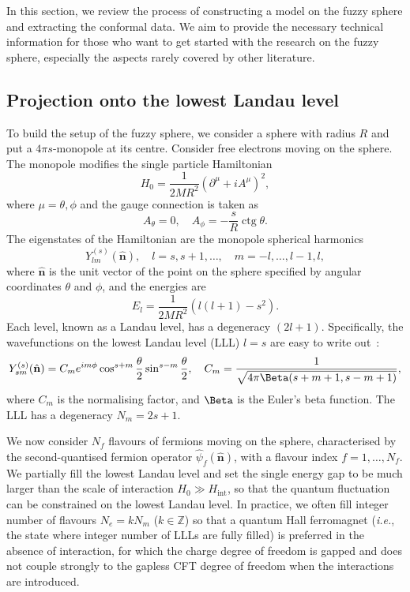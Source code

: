 \documentclass{timesjhep}
\begin{document}
In this section, we review the process of constructing a model on the fuzzy sphere and extracting the conformal data. We aim to provide the necessary technical information for those who want to get started with the research on the fuzzy sphere, especially the aspects rarely covered by other literature.

\subsection{Projection onto the lowest Landau level}
\label{sec:setup}

To build the setup of the fuzzy sphere, we consider a sphere with radius $R$ and put a $4\pi s$-monopole at its centre. Consider free electrons moving on the sphere. The monopole modifies the single particle Hamiltonian~\cite{Haldane1983LLL,Wu1976LLL,Greiter2011LLL,Hasebe2010LLL}
\begin{equation}
    H_0=\frac{1}{2MR^2}(\partial^\mu+iA^\mu)^2,
\end{equation} 
where $\mu=\theta,\phi$ and the gauge connection is taken as
\begin{equation}
    A_\theta=0,\quad A_\phi=-\frac{s}{R}\operatorname{ctg}\theta.
\end{equation}
The eigenstates of the Hamiltonian are the monopole spherical harmonics
\begin{equation}
    Y_{lm}^{(s)}(\hat{\mathbf{n}}),\quad l=s,s+1,\dots,\quad m=-l,\dots,l-1,l,
\end{equation}
where $\hat{\mathbf{n}}$ is the unit vector of the point on the sphere specified by angular coordinates $\theta$ and $\phi$, and the energies are
\begin{equation}
    E_l=\frac{1}{2MR^2}(l(l+1)-s^2).
\end{equation}
Each level, known as a Landau level, has a degeneracy $(2l+1)$. Specifically, the wavefunctions on the lowest Landau level (LLL) $l=s$ are easy to write out~:
\begin{equation}
    Y_{sm}^{(s)}(\hat{\mathbf{n}})=C_me^{im\phi}\cos^{s+m}\frac{\theta}{2}\sin^{s-m}\frac{\theta}{2},\quad C_m=\frac{1}{{\sqrt{4\pi\Beta(s+m+1,s-m+1)}}},
\end{equation}
where $C_m$ is the normalising factor, and $\Beta$ is the Euler's beta function. The LLL has a degeneracy $N_m=2s+1$.

We now consider $N_f$ flavours of fermions moving on the sphere, characterised by the second-quantised fermion operator $\hat{\psi}_f(\hat{\mathbf{n}})$, with a flavour index $f=1,\dots,N_f$. We partially fill the lowest Landau level and set the single energy gap to be much larger than the scale of interaction $H_0\gg H_\textrm{int}$, so that the quantum fluctuation can be constrained on the lowest Landau level. In practice, we often fill integer number of flavours $N_e=kN_m$ ($k\in\mathbb{Z}$) so that a quantum Hall ferromagnet (\textit{i.e.}, the state where integer number of LLLs are fully filled) is preferred in the absence of interaction, for which the charge degree of freedom is gapped and does not couple strongly to the gapless CFT degree of freedom when the interactions are introduced.
\end{document}
